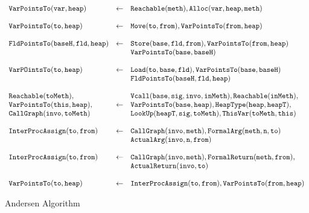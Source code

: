 \begin{figure}[ht]
  \begin{math}
    \begin{array}[\textwidth]{lcl}
      \mathtt{VarPointsTo(var, heap)} & \gets & \mathtt{Reachable(meth), Alloc(var, heap, meth)} \\
      \\
      \mathtt{VarPointsTo(to, heap)} & \gets & \mathtt{Move(to, from), VarPointsTo(from, heap)} \\
      \\
      \mathtt{FldPointsTo(baseH, fld, heap)} & \gets & \mathtt{Store(base, fld, from), VarPointsTo(from, heap)} \\
      & & \mathtt{VarPointsTo(base, baseH)} \\
      \\
      \mathtt{VarPOintsTo(to, heap)} & \gets & \mathtt{Load(to, base, fld), VarPointsTo(base, baseH)} \\
      & & \mathtt{FldPointsTo(baseH, fld, heap)} \\
      \\
      \mathtt{Reachable(toMeth)},  & & \mathtt{Vcall(base, sig, invo, inMeth)}, \mathtt{Reachable(inMeth)}, \\
      \mathtt{VarPointsTo(this, heap)}, & \gets & \mathtt{VarPointsTo(base, heap)}, \mathtt{HeapType(heap, heapT)}, \\
      \mathtt{CallGraph(invo, toMeth)} & & \mathtt{LookUp(heapT, sig, toMeth), ThisVar(toMeth, this)} \\
      \\
      \mathtt{InterProcAssign(to, from)} & \gets & \mathtt{CallGraph(invo, meth), FormalArg(meth, n, to)} \\
      & & \mathtt{ActualArg(invo, n, from)} \\
      \\
      \mathtt{InterProcAssign(to, from)} & \gets & \mathtt{CallGraph(invo, meth), FormalReturn(meth, from), } \\
      & & \mathtt{ActualReturn(invo, to)} \\
      \\
      \mathtt{VarPointsTo(to, heap)} & \gets & \mathtt{InterProcAssign(to, from), VarPointsTo(from, heap)} \\
    \end{array}
  \end{math}

  \caption{Andersen Algorithm}
  \label{fig:andersen-logic}
\end{figure}


